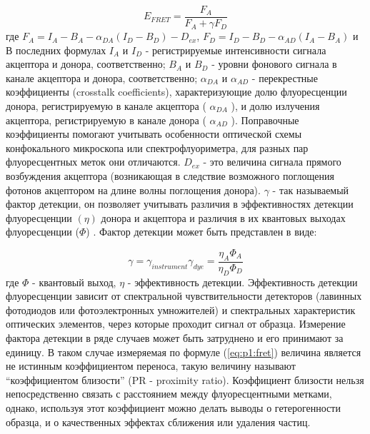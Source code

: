 \begin{equation}
   E_{FRET}=\frac{F_A}{F_A+\gamma F_D}
   \label{eq:p1:fret}
\end{equation}
    где $F_A= I_A - B_A - \alpha_{DA} (I_D - B_D) - D_{ex}$, $F_D = I_D - B_D - \alpha_{AD} (I_A - B_A )$ и 
В последних формулах $I_A$ и $I_D$  - регистрируемые интенсивности сигнала акцептора и донора, соответственно; $B_A$ и $ B_D$ - уровни фонового сигнала в канале акцептора и донора, соответственно;  $\alpha_{DA}$ и $\alpha_{AD}$ - перекрестные коэффициенты (crosstalk coefficients), характеризующие долю флуоресценции донора, регистрируемую в канале акцептора ( $\alpha_{DA}$ ), и долю излучения акцептора, регистрируемую в канале донора ( $\alpha_{AD}$ ). Поправочные коэффициенты помогают учитывать особенности  оптической схемы конфокального микроскопа или спектрофлуориметра, для разных пар флуоресцентных меток они отличаются. $D_{ex}$ - это величина сигнала прямого возбуждения акцептора (возникающая в следствие возможного поглощения фотонов акцептором на длине волны поглощения донора). $\gamma$ - так называемый фактор детекции, он позволяет учитывать различия в эффективностях детекции флуоресценции $(\eta)$ донора и акцептора и различия в их квантовых выходах флуоресценции ($\Phi$) \cite{dahan_ratiometric_1999}. Фактор детекции может быть представлен в виде:

\begin{equation}
    \gamma = \gamma_{instrument} \gamma_{dye} = \frac{\eta_A \Phi_A}{\eta_D \Phi_D}
\end{equation}
где $\Phi$ - квантовый выход, $\eta$ - эффективность детекции.
    Эффективность детекции флуоресценции зависит от спектральной чувствительности детекторов (лавинных фотодиодов или фотоэлектронных умножителей) и спектральных характеристик оптических элементов, через которые проходит сигнал от образца. 
    Измерение фактора детекции в ряде случаев может быть затруднено и его принимают за единицу. В таком случае измеряемая по формуле (\ref{eq:p1:fret}) величина является не истинным коэффициентом переноса, такую величину называют ``коэффициентом близости'' (PR - proximity ratio). Коэффициент близости нельзя непосредственно связать с расстоянием между флуоресцентными метками, однако, используя этот коэффициент можно делать выводы о гетерогенности образца, и о качественных эффектах сближения или удаления частиц.

